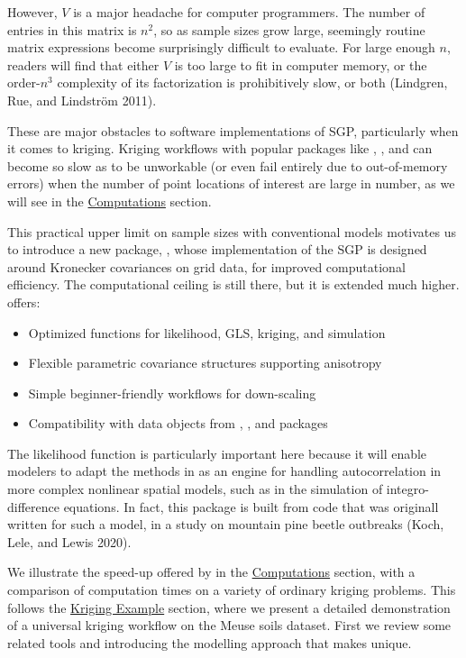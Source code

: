 However, \(V\) is a major headache for computer programmers. The number of entries in this matrix is \(n^2\), so as sample sizes grow large, seemingly routine matrix expressions become surprisingly difficult to evaluate. For large enough \(n\), readers will find that either \(V\) is too large to fit in computer memory, or the order-\(n^3\) complexity of its factorization is prohibitively slow, or both (Lindgren, Rue, and Lindström 2011).

These are major obstacles to software implementations of SGP, particularly when it comes to kriging. Kriging workflows with popular packages like , , and  can become so slow as to be unworkable (or even fail entirely due to out-of-memory errors) when the number of point locations of interest are large in number, as we will see in the \protect\hyperlink{computations}{Computations} section.

This practical upper limit on sample sizes with conventional models motivates us to introduce a new package, , whose implementation of the SGP is designed around Kronecker covariances on grid data, for improved computational efficiency. The computational ceiling is still there, but it is extended much higher.  offers:

\begin{itemize}
\tightlist
\item
  Optimized functions for likelihood, GLS, kriging, and simulation
\item
  Flexible parametric covariance structures supporting anisotropy
\item
  Simple beginner-friendly workflows for down-scaling
\item
  Compatibility with data objects from , , and  packages
\end{itemize}

The likelihood function is particularly important here because it will enable modelers to adapt the methods in  as an engine for handling autocorrelation in more complex nonlinear spatial models, such as in the simulation of integro-difference equations. In fact, this package is built from code that was originall written for such a model, in a study on mountain pine beetle outbreaks (Koch, Lele, and Lewis 2020).

We illustrate the speed-up offered by  in the \protect\hyperlink{computations}{Computations} section, with a comparison of computation times on a variety of ordinary kriging problems. This follows the \protect\hyperlink{kriging-example}{Kriging Example} section, where we present a detailed demonstration of a universal kriging workflow on the Meuse soils dataset. First we review some related tools and introducing the modelling approach that makes  unique.

